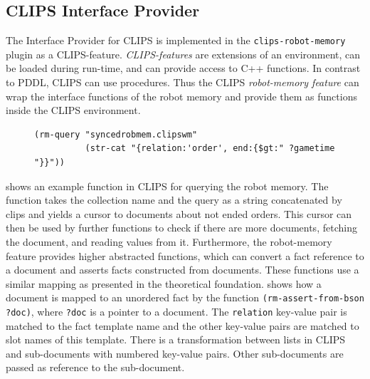 \subsection{CLIPS Interface Provider}
\label{sec:impl-clips}
The Interface Provider for CLIPS is implemented in the
\texttt{clips-robot-memory} plugin as a CLIPS-feature. \emph{CLIPS-features} are extensions
of an environment, can be loaded during run-time, and can provide
access to C++ functions. In contrast to PDDL, CLIPS can use procedures. Thus
the CLIPS \emph{robot-memory feature} can wrap the interface functions
of the robot memory and provide them as functions inside the CLIPS
environment.
\begin{figure}
  \begin{lstlisting}[showlines,style=ReallySmallCLIPS, caption={CLIPS function to execute a query},
  label=lst:clips-rm,
  emph={skill, args, state, target, res},
  emphstyle=\bfseries\color{green!80!black},
  emph={[2]\?skill, \$\?args, wait-for-lock, \?target, use,
  WAIT-FOR-LOCK, SKILL-EXECUTION, running},
  emphstyle={[2]\bfseries\color{blue!80!black}},
  morekeywords={retract, assert, modify, skill-call, skill-to-execute,
    wait-for-lock},
  numbers=none]
(rm-query "syncedrobmem.clipswm"
          (str-cat "{relation:'order', end:{$gt:" ?gametime "}}"))
\end{lstlisting} %
\end{figure}
 shows an example function in CLIPS for querying
the robot memory. The function takes the collection name and the query
as a string concatenated by clips and yields a cursor to documents
about not ended orders. This cursor can then be used by further
functions to check if there are more documents, fetching the document,
and reading values from it. Furthermore, the robot-memory feature
provides higher abstracted functions, which can convert a fact
reference to a document and asserts facts constructed from
documents. These functions use a similar mapping as presented in the
theoretical foundation.  shows how a document is
mapped to an unordered fact by the function
\texttt{(rm-assert-from-bson ?doc)}, where \texttt{?doc} is a pointer
to a document. The \texttt{relation} key-value pair is
matched to the fact template name and the other key-value pairs are
matched to slot names of this template. There is a transformation
between lists in CLIPS and sub-documents with numbered key-value
pairs. Other sub-documents are passed as reference to the
sub-document.

